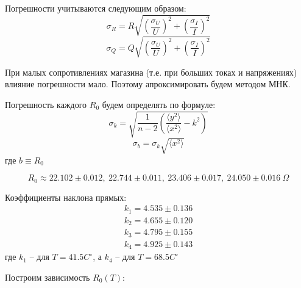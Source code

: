 \documentclass[a4paper,12pt]{report}
\begin{document}
    Погрешности учитываются следующим образом:
    \begin{equation*}
        \sigma_R=R\sqrt{\left( \frac{\sigma_U}{U} \right) ^ 2 + \left( \frac{\sigma_I}{I} \right)^2}
    \end{equation*}
    \begin{equation*}
        \sigma_Q=Q\sqrt{\left(\frac{\sigma_U}{U}\right)^2 + \left( \frac{\sigma_I}{I} \right)^2}
    \end{equation*}

    При малых сопротивлениях магазина (т.е. при больших токах и напряжениях) влияние погрешности мало. Поэтому апроксимировать будем методом МНК.

    Погрешность каждого $R_0$ будем определять по формуле:
    \begin{equation*}
        \sigma_k=\sqrt{\frac{1}{n - 2}\left(\frac{\langle y^2 \rangle}{\langle x^2 \rangle}- k^2\right)}
    \end{equation*}
    \begin{equation*}
        \sigma_b=\sigma_k\sqrt{\langle x^2 \rangle}
    \end{equation*}
    где $b\equiv R_0$

    \[R_0\approx 22.102\pm 0.012,\ 22.744\pm 0.011,\ 23.406\pm 0.017,\ 24.050\pm 0.016\ \Omega\]

    Коэффициенты наклона прямых:
    \begin{align*}
        k_1=4.535 \pm 0.136 \\ 
        k_2=4.655 \pm 0.120 \\ 
        k_3=4.795 \pm 0.155 \\ 
        k_4=4.925 \pm 0.143
    \end{align*}
    где $k_1$ -- для $T=41.5C^\circ$, а $k_4$ -- для $T=68.5C^\circ$

    Построим зависимость $R_0(T)$:
\end{document}
